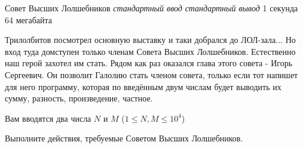 \begin{problem}%
{Совет Высших Лолшебников}%
{\textsl{стандартный ввод}}%
{\textsl{стандартный вывод}}%
{1 секунда}%
{64 мегабайта}{}

Трилолбитов посмотрел основную выставку и таки добрался до ЛОЛ-зала... Но вход туда домступен только членам Совета Высших Лолшебников. Естественно наш герой захотел им стать. Рядом как раз оказался глава этого совета - Игорь Сергеевич. Он позволит Галолию стать членом совета, только если тот напишет для него программу, которая по введённым двум числам будет выводить их сумму, разность, произведение, частное. 

\InputFile

Вам вводятся два числа $N$ и $M$ ($1 \le N, M \le 10^4$)

\OutputFile

Выполните действия, требуемые Советом Высших Лолшебников.

\Examples

\begin{example}
%
\end{example}
\end{problem}
